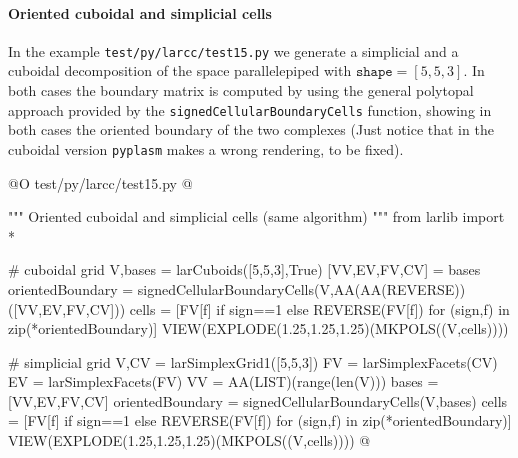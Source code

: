 \documentclass[11pt,oneside]{article}	%
\begin{document}
\paragraph{Oriented cuboidal and simplicial cells}
In the example \texttt{test/py/larcc/test15.py} we generate a simplicial and a cuboidal decomposition of the space parallelepiped with $\texttt{shape}=[5,5,3]$.
In both cases the boundary matrix is computed by using the general polytopal approach provided by the \texttt{signedCellularBoundaryCells} function, showing in both cases the oriented boundary of the two complexes
(Just notice that in the cuboidal version \texttt{pyplasm} makes a wrong rendering, to be fixed).

@O test/py/larcc/test15.py
@{""" Oriented cuboidal and simplicial cells (same algorithm) """
from larlib import *

# cuboidal grid
V,bases = larCuboids([5,5,3],True)
[VV,EV,FV,CV] = bases
orientedBoundary = signedCellularBoundaryCells(V,AA(AA(REVERSE))([VV,EV,FV,CV]))
cells = [FV[f] if sign==1 else REVERSE(FV[f])  for (sign,f) in zip(*orientedBoundary)]
VIEW(EXPLODE(1.25,1.25,1.25)(MKPOLS((V,cells))))

# simplicial grid
V,CV = larSimplexGrid1([5,5,3])
FV = larSimplexFacets(CV)
EV = larSimplexFacets(FV)
VV = AA(LIST)(range(len(V)))
bases = [VV,EV,FV,CV]
orientedBoundary = signedCellularBoundaryCells(V,bases)
cells = [FV[f] if sign==1 else REVERSE(FV[f])  for (sign,f) in zip(*orientedBoundary)]
VIEW(EXPLODE(1.25,1.25,1.25)(MKPOLS((V,cells))))
@}
\end{document}
